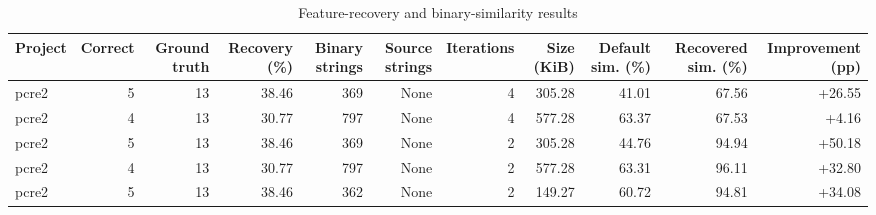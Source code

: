 \begin{table}[htbp]
\centering
\caption{Feature-recovery and binary-similarity results}
\label{tab:feature-recovery-results}
\small
\begin{tabular}{lrrrrrrrrrr}
\toprule
Project & Correct & Ground truth & Recovery (\%) & Binary strings & Source strings & Iterations & Size (KiB) & Default sim. (\%) & Recovered sim. (\%) & Improvement (pp) \\
\midrule
pcre2 & 5 & 13 & 38.46 & 369 & None & 4 & 305.28 & 41.01 & 67.56 & +26.55 \\
pcre2 & 4 & 13 & 30.77 & 797 & None & 4 & 577.28 & 63.37 & 67.53 & +4.16 \\
pcre2 & 5 & 13 & 38.46 & 369 & None & 2 & 305.28 & 44.76 & 94.94 & +50.18 \\
pcre2 & 4 & 13 & 30.77 & 797 & None & 2 & 577.28 & 63.31 & 96.11 & +32.80 \\
pcre2 & 5 & 13 & 38.46 & 362 & None & 2 & 149.27 & 60.72 & 94.81 & +34.08 \\
\bottomrule
\end{tabular}
\end{table}
